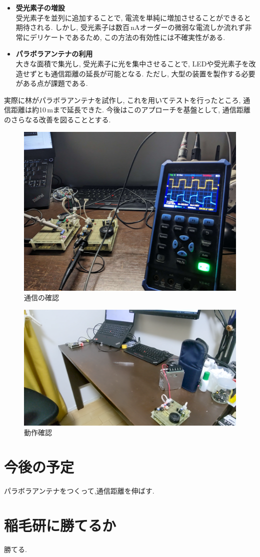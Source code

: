 \documentclass[a4paper,10pt]{article}
\begin{document}
\begin{multicols}{2}[\raggedcolumns]
\begin{itemize}
\item
  \textbf{受光素子の増設}\\
  受光素子を並列に追加することで, 電流を単純に増加させることができると期待される.  
  しかし, 受光素子は数百\,nAオーダーの微弱な電流しか流れず非常にデリケートであるため, この方法の有効性には不確実性がある.  

\item
  \textbf{パラボラアンテナの利用}\\
  大きな面積で集光し, 受光素子に光を集中させることで, LEDや受光素子を改造せずとも通信距離の延長が可能となる.  
  ただし, 大型の装置を製作する必要がある点が課題である.  
\end{itemize}

実際に林がパラボラアンテナを試作し, これを用いてテストを行ったところ, 通信距離は約10\,mまで延長できた.  
今後はこのアプローチを基盤として, 通信距離のさらなる改善を図ることとする.  

\begin{figure}[H]
    \centering
    \includegraphics[width=0.8\linewidth]{figure/test.jpg} 
    \caption{通信の確認} 
    \label{fig:test}
\end{figure}

\begin{figure}[H]
    \centering
    \includegraphics[width=0.8\linewidth]{figure/check.png} 
    \caption{動作確認} 
    \label{fig:check}
\end{figure}

\section{今後の予定}
パラボラアンテナをつくって,通信距離を伸ばす.

\section{稲毛研に勝てるか}
勝てる.
\end{multicols}
\end{document}
